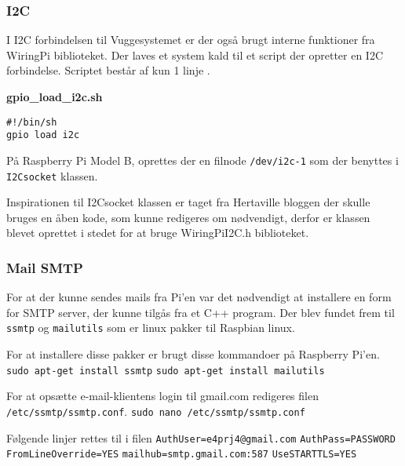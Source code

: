 \subsubsection*{I2C}

I I2C forbindelsen til Vuggesystemet er der også brugt interne funktioner fra WiringPi biblioteket. Der laves et system kald til et script der opretter en I2C forbindelse. Scriptet består af kun 1 linje .

\textbf{gpio\_load\_i2c.sh}
\begin{lstlisting}
#!/bin/sh
gpio load i2c
\end{lstlisting}

På Raspberry Pi Model B, oprettes der en filnode \verb+/dev/i2c-1+ som der benyttes i \verb+I2Csocket+ klassen.

Inspirationen til I2Csocket klassen er taget fra Hertaville bloggen \citep{website:ic2lib} der skulle bruges en åben kode, som kunne redigeres om nødvendigt, derfor er klassen blevet oprettet i stedet for at bruge WiringPiI2C.h biblioteket.

\subsubsection*{Mail SMTP}

For at der kunne sendes mails fra Pi'en var det nødvendigt at installere en form for SMTP server, der kunne tilgås fra et C++ program. Der blev fundet frem til \verb+ssmtp+ og \verb+mailutils+ \citep{website:ssmtpmailutils} som er linux pakker til Raspbian linux.

For at installere disse pakker er brugt disse kommandoer på Raspberry Pi'en. \newline
\verb+sudo apt-get install ssmtp+ \newline
\verb+sudo apt-get install mailutils+

For at opsætte e-mail-klientens login til gmail.com redigeres filen \verb+/etc/ssmtp/ssmtp.conf+. \newline
\verb+sudo nano /etc/ssmtp/ssmtp.conf+

Følgende linjer rettes til i filen\newline
\verb+AuthUser=e4prj4@gmail.com+ \newline
\verb+AuthPass=PASSWORD+ \newline
\verb+FromLineOverride=YES+ \newline
\verb+mailhub=smtp.gmail.com:587+ \newline
\verb+UseSTARTTLS=YES+

